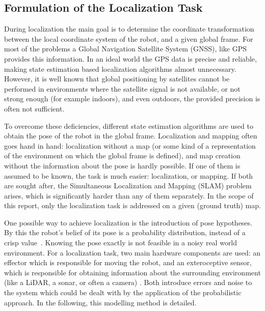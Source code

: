 \subsection{Formulation of the Localization Task}

During localization the main goal is to determine the coordinate transformation between the local coordinate system of the robot,
and a given global frame.
For most of the problems a Global Navigation Satellite System (GNSS), like GPS provides
this information.
In an ideal world the GPS data is precise and reliable, making state estimation based localization algorithms almost unnecessary.
However, it is well known that global positioning by satellites cannot be performed in environments
where the satellite signal is not available, or not strong enough
(for example indoors), and even outdoors, the provided precision is often not sufficient.

To overcome these deficiencies, different state estimation algorithms are used to obtain the pose of the robot in the global frame.
Localization and mapping often goes hand in hand: localization without a map
(or some kind of a representation of the environment on which the global frame is defined),
and map creation without the information about the pose is hardly possible.
If one of them is assumed to be known, the task is much easier: localization, or mapping.
If both are sought after, the Simultaneous Localization and Mapping (SLAM) problem arises,
which is significantly harder than any of them separately.
In the scope of this report, only the localization task is addressed on a given (ground truth) map.

One possible way to achieve localization is the introduction of pose hypotheses.
By this the robot's belief of its pose is a probability distribution, instead of a crisp value~\cite{Thrun2005}.
Knowing the pose exactly is not feasible in a noisy real world environment.
For a localization task, two main hardware components are used: an effector which is responsible for moving the robot,
and an exteroceptive sensor, which is responsible for obtaining information about the surrounding environment (like a LiDAR, a sonar, or often a camera)
\cite{Siegwart2011}.
Both introduce errors and noise to the system which could be dealt with by the application of the probabilistic approach.
In the following, this modelling method is detailed.

